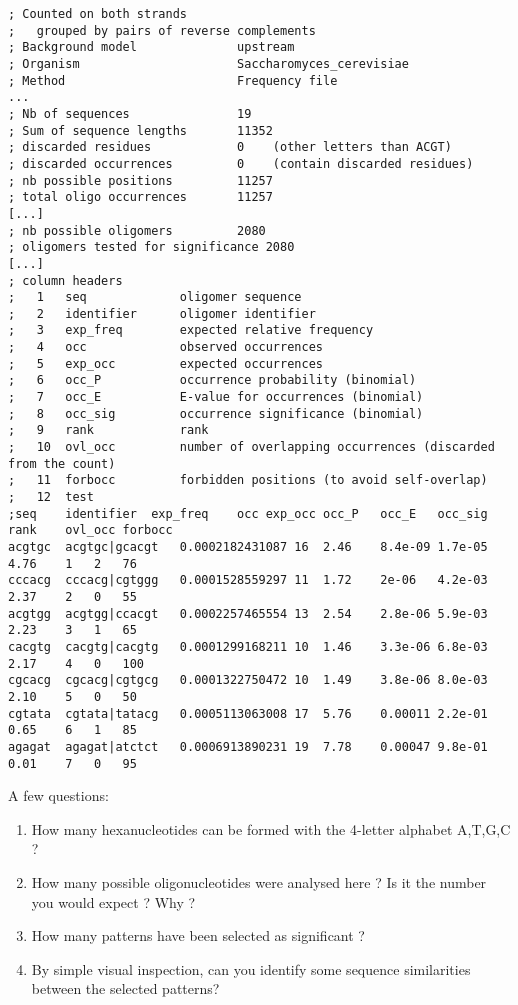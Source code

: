 {\color{OliveGreen} \begin{footnotesize} 
\begin{verbatim}
; Counted on both strands
; 	grouped by pairs of reverse complements
; Background model             	upstream
; Organism                     	Saccharomyces_cerevisiae
; Method                       	Frequency file
...
; Nb of sequences              	19
; Sum of sequence lengths      	11352
; discarded residues           	0	 (other letters than ACGT)
; discarded occurrences        	0	 (contain discarded residues)
; nb possible positions        	11257
; total oligo occurrences      	11257
[...]
; nb possible oligomers        	2080
; oligomers tested for significance	2080
[...]
; column headers
;	1	seq            	oligomer sequence
;	2	identifier     	oligomer identifier
;	3	exp_freq       	expected relative frequency
;	4	occ            	observed occurrences
;	5	exp_occ        	expected occurrences
;	6	occ_P          	occurrence probability (binomial)
;	7	occ_E          	E-value for occurrences (binomial)
;	8	occ_sig        	occurrence significance (binomial)
;	9	rank           	rank
;	10	ovl_occ        	number of overlapping occurrences (discarded from the count)
;	11	forbocc        	forbidden positions (to avoid self-overlap)
;	12	test           	
;seq	identifier	exp_freq	occ	exp_occ	occ_P	occ_E	occ_sig	rank	ovl_occ	forbocc
acgtgc	acgtgc|gcacgt	0.0002182431087	16	2.46	8.4e-09	1.7e-05	4.76	1	2	76
cccacg	cccacg|cgtggg	0.0001528559297	11	1.72	2e-06	4.2e-03	2.37	2	0	55
acgtgg	acgtgg|ccacgt	0.0002257465554	13	2.54	2.8e-06	5.9e-03	2.23	3	1	65
cacgtg	cacgtg|cacgtg	0.0001299168211	10	1.46	3.3e-06	6.8e-03	2.17	4	0	100
cgcacg	cgcacg|cgtgcg	0.0001322750472	10	1.49	3.8e-06	8.0e-03	2.10	5	0	50
cgtata	cgtata|tatacg	0.0005113063008	17	5.76	0.00011	2.2e-01	0.65	6	1	85
agagat	agagat|atctct	0.0006913890231	19	7.78	0.00047	9.8e-01	0.01	7	0	95
\end{verbatim} \end{footnotesize}
}


A few questions:
\begin{enumerate}
\item How many hexanucleotides can be formed with the 4-letter alphabet A,T,G,C ?
\item How many possible oligonucleotides were analysed here ? Is it the
  number you would expect ? Why ?
\item How many patterns have been selected as significant ?
\item By simple visual inspection, can you identify some sequence
  similarities between the selected patterns?
\end{enumerate}

